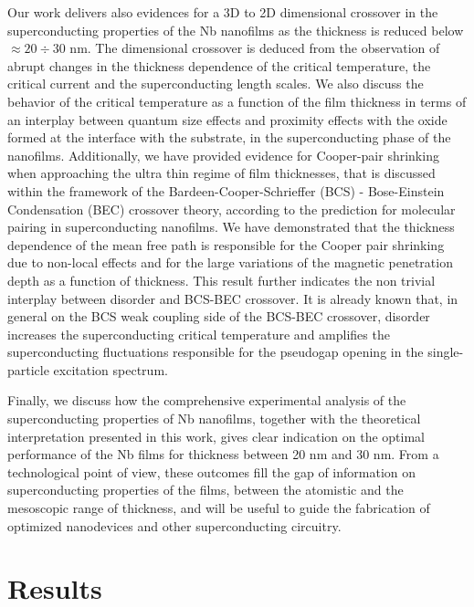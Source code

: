 \documentclass[reprint,onecolumn,superscriptaddress,a4paper,nofootinbib,floatfix]{revtex4-1}
\begin{document}
Our work delivers also evidences for a 3D to 2D dimensional crossover in the superconducting properties of the Nb nanofilms as the thickness is reduced below $\approx 20\div 30$ nm. The dimensional crossover is deduced from the observation of abrupt changes in the thickness dependence of the critical temperature, the critical current and the superconducting length scales.  We also discuss the behavior of the critical temperature as a function of the film thickness in terms of an interplay between quantum size effects and proximity effects with the oxide formed at the interface with the substrate, in the superconducting phase of the nanofilms. Additionally, we have provided evidence for Cooper-pair shrinking when approaching the ultra thin regime of film thicknesses, that is discussed within the framework of the Bardeen-Cooper-Schrieffer (BCS) - Bose-Einstein Condensation (BEC) crossover theory, according to the prediction for molecular pairing in superconducting nanofilms.\cite{Chen2012} We have demonstrated that the thickness dependence of the mean free path is responsible for the Cooper pair shrinking due to non-local effects and for the large variations of the magnetic penetration depth as a function of thickness. This result further indicates the non trivial interplay between disorder and BCS-BEC crossover. It is already known that, in general on the BCS weak coupling side of the BCS-BEC crossover, disorder increases the superconducting critical temperature and amplifies the superconducting fluctuations responsible for the pseudogap opening in the single-particle excitation spectrum.\cite{Palestini2013} 

Finally, we discuss how the comprehensive experimental analysis of the superconducting properties of Nb nanofilms, together with the theoretical interpretation presented in this work, gives clear indication on the optimal performance of the Nb films for thickness between 20 nm and 30 nm.
From a technological point of view, these outcomes fill the gap of information on superconducting properties of the films, between the atomistic and the mesoscopic range of thickness, and will be useful to guide the fabrication of optimized nanodevices and other superconducting circuitry.
 
\section*{Results}
\end{document}
